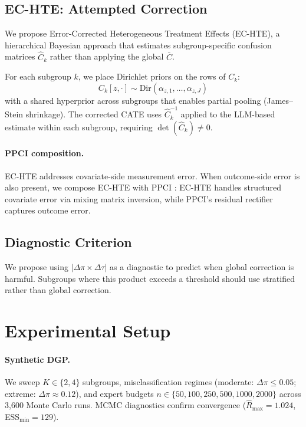 \documentclass[11pt]{article}
\begin{document}
\subsection{EC-HTE: Attempted Correction}
\label{sec:ec-hte}

We propose Error-Corrected Heterogeneous Treatment Effects (EC-HTE), a hierarchical Bayesian approach that estimates subgroup-specific confusion matrices $\hat{C}_k$ rather than applying the global $\bar{C}$.

For each subgroup $k$, we place Dirichlet priors on the rows of $C_k$:
\begin{equation}
C_k[z, \cdot] \sim \text{Dir}(\alpha_{z,1}, \ldots, \alpha_{z,J})
\end{equation}
with a shared hyperprior across subgroups that enables partial pooling (James--Stein shrinkage).
The corrected CATE uses $\hat{C}_k^{-1}$ applied to the LLM-based estimate within each subgroup, requiring $\det(\hat{C}_k) \neq 0$.

\paragraph{PPCI composition.}
EC-HTE addresses covariate-side measurement error.
When outcome-side error is also present, we compose EC-HTE with PPCI \cite{sui2026ppci}: EC-HTE handles structured covariate error via mixing matrix inversion, while PPCI's residual rectifier captures outcome error.

\subsection{Diagnostic Criterion}

We propose using $|\Delta\pi \times \Delta\tau|$ as a diagnostic to predict when global correction is harmful.
Subgroups where this product exceeds a threshold should use stratified rather than global correction.

\section{Experimental Setup}

\paragraph{Synthetic DGP.}
We sweep $K \in \{2, 4\}$ subgroups, misclassification regimes (moderate: $\Delta\pi \leq 0.05$; extreme: $\Delta\pi \approx 0.12$), and expert budgets $n \in \{50, 100, 250, 500, 1000, 2000\}$ across 3{,}600 Monte Carlo runs.
MCMC diagnostics confirm convergence ($\hat{R}_{\max} = 1.024$, ESS$_{\min} = 129$).
\end{document}
